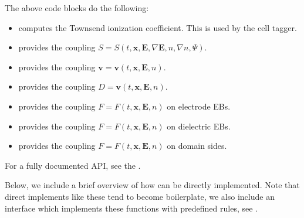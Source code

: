 \documentclass[letterpaper,10pt,english]{sphinxmanual}
\begin{document}
\begin{sphinxVerbatim}[commandchars=\\\{\},formatcom=\scriptsize]
           
\end{sphinxVerbatim}

The above code blocks do the following:
\begin{itemize}
\item {} 
 computes the Townsend ionization coefficient.
This is used by the cell tagger.

\item {} 
 provides the coupling \(S = S(t, \mathbf{x}, \mathbf{E}, \nabla\mathbf{E}, n, \nabla n, \Psi)\).

\item {} 
 provides the coupling \(\mathbf{v} = \mathbf{v}\left(t, \mathbf{x}, \mathbf{E}, n\right)\).

\item {} 
 provides the coupling \(D = \mathbf{v}\left(t, \mathbf{x}, \mathbf{E}, n\right)\).

\item {} 
 provides the coupling \(F = F(t, \mathbf{x}, \mathbf{E}, n)\) on electrode EBs.

\item {} 
 provides the coupling \(F = F(t, \mathbf{x}, \mathbf{E}, n)\) on dielectric EBs.

\item {} 
 provides the coupling \(F = F(t, \mathbf{x}, \mathbf{E}, n)\) on domain sides.

\end{itemize}

For a fully documented API, see the .

Below, we include a brief overview of how  can be directly implemented.
Note that direct implements like these tend to become boilerplate, we also include an interface which implements these functions with pre\sphinxhyphen{}defined rules, see {\hyperref[\detokenize{Applications/CdrPlasmaModel:chap-cdrplasmajson}]{}}.
\end{document}

